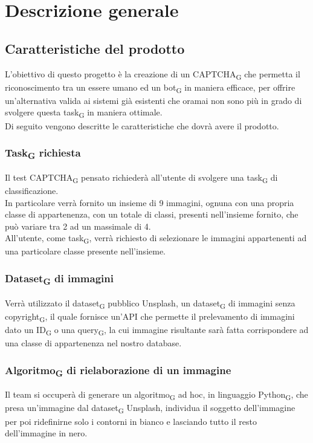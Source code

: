 \section{Descrizione generale}

\subsection{Caratteristiche del prodotto}
L'obiettivo di questo progetto è la creazione di un CAPTCHA\textsubscript{G} che permetta il riconoscimento tra un essere umano ed un bot\textsubscript{G} in maniera efficace, per offrire un'alternativa valida ai sistemi già esistenti che oramai non sono più in grado di svolgere questa task\textsubscript{G} in maniera ottimale.\\

\noindent Di seguito vengono descritte le caratteristiche che dovrà avere il prodotto.

\subsubsection{Task\textsubscript{G} richiesta}
Il test CAPTCHA\textsubscript{G} pensato richiederà all'utente di svolgere una task\textsubscript{G} di classificazione.\\
In particolare verrà fornito un insieme di 9 immagini, ognuna con una propria classe di appartenenza, con un totale di classi, presenti nell'insieme fornito, che può variare tra 2 ad un massimale di 4.\\
All'utente, come task\textsubscript{G}, verrà richiesto di selezionare le immagini appartenenti ad una particolare classe presente nell'insieme.

\subsubsection{Dataset\textsubscript{G} di immagini}
Verrà utilizzato il dataset\textsubscript{G} pubblico Unsplash, un dataset\textsubscript{G} di immagini senza copyright\textsubscript{G}, il quale fornisce un'API che permette il prelevamento di immagini dato un ID\textsubscript{G} o una query\textsubscript{G}, la cui immagine risultante sarà fatta corrispondere ad una classe di appartenenza nel nostro database.

\subsubsection{Algoritmo\textsubscript{G} di rielaborazione di un immagine}
Il team si occuperà di generare un algoritmo\textsubscript{G} ad hoc, in linguaggio Python\textsubscript{G}, che presa un'immagine dal dataset\textsubscript{G} Unsplash, individua il soggetto dell'immagine per poi ridefinirne solo i contorni in bianco e lasciando tutto il resto dell'immagine in nero.  

